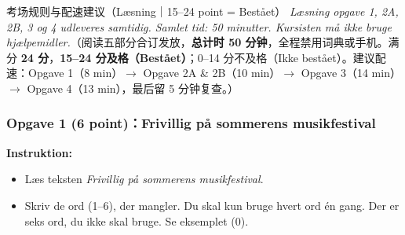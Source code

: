 

\begin{tipbox}{考场规则与配速建议（Læsning｜15--24 point = Bestået）}
\small
\textit{Læsning opgave 1, 2A, 2B, 3 og 4 udleveres samtidig. Samlet tid: 50 minutter. Kursisten må ikke bruge hjælpemidler.}（阅读五部分合订发放，\textbf{总计时 50 分钟}，全程禁用词典或手机。满分 \textbf{24 分}，\textbf{15--24 分及格（Bestået）}；0--14 分不及格（Ikke bestået）。建议配速：Opgave 1（8 min）$\rightarrow$ Opgave 2A \& 2B（10 min）$\rightarrow$ Opgave 3（14 min）$\rightarrow$ Opgave 4（13 min），最后留 5 分钟复查。）
\end{tipbox}

\subsubsection*{Opgave 1 (6 point)：Frivillig på sommerens musikfestival}

\textbf{Instruktion:}
\begin{itemize}
  \item Læs teksten \textit{Frivillig på sommerens musikfestival}.
  \item Skriv de ord (1--6), der mangler. Du skal kun bruge hvert ord én gang. Der er seks ord, du ikke skal bruge. Se eksemplet (0).
\end{itemize}

